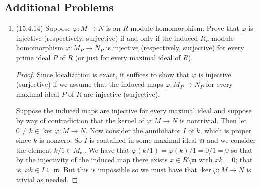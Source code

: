 \documentclass[11pt]{article}
\begin{document}
\subsection*{Additional Problems}
\begin{enumerate}
    \item (15.4.14) Suppose $\varphi\colon M\to N$ is an $R$-module homomorphism. Prove that $\varphi$ is injective (respectively, surjective) if and only if the induced $R_P$-module homomorphism $\varphi\colon M_P\to N_P$ is injective (respectively, surjective) for every prime ideal $P$ of $R$ (or just for every maximal ideal of $R$). \begin{proof}
        Since localization is exact, it suffices to show that $\varphi$ is injective (surjective) if we assume that the induced maps $\varphi\colon M_P\to N_P$ for every maximal ideal $P$ of $R$ are injective (surjective).

        Suppose the induced maps are injective for every maximal ideal and suppose by way of contradiction that the kernel of $\varphi\colon M\to N$ is nontrivial. Then let $0\neq k\in \ker \varphi\colon M\to N$. Now consider the annihiliator $I$ of $k$, which is proper since $k$ is nonzero. So $I$ is contained in some maximal ideal $\mathfrak{m}$ and we consider the element $k/1\in M_\mathfrak{m}$. We have that $\varphi(k/1) =\varphi(k)/1 = 0/1 = 0$ so that by the injectivity of the induced map there exists $x\in R\setminus\mathfrak{m}$ with $xk = 0$; that is, $xk\in I\subseteq \mathfrak{m}$. But this is impossible so we must have that $\ker \varphi\colon M\to N$ is trivial as needed.


\end{proof}
\end{enumerate}
\end{document}
